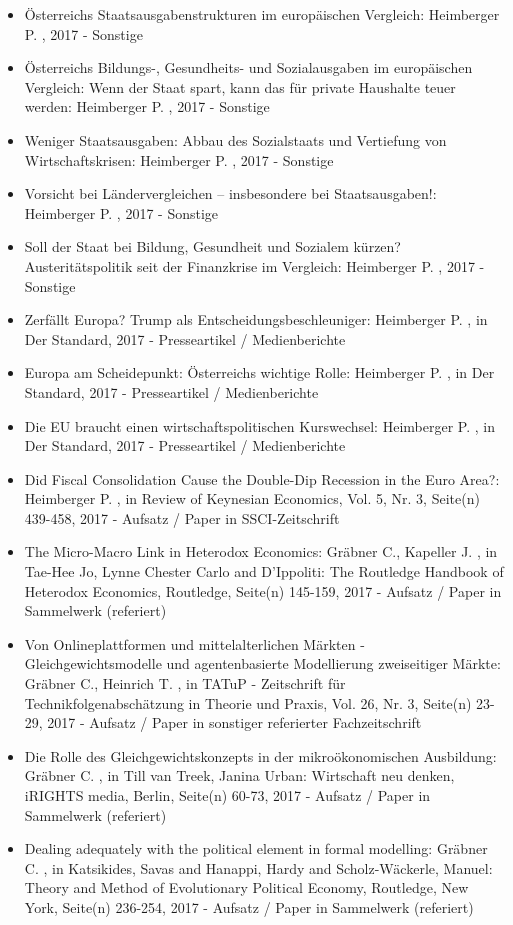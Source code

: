 \begin{itemize}
	 \item Österreichs Staatsausgabenstrukturen im europäischen Vergleich: Heimberger P. , 2017 - Sonstige
	 \item Österreichs Bildungs-, Gesundheits- und Sozialausgaben im europäischen Vergleich: Wenn der Staat spart, kann das für private Haushalte teuer werden: Heimberger P. , 2017 - Sonstige
	 \item Weniger Staatsausgaben: Abbau des Sozialstaats und Vertiefung von Wirtschaftskrisen: Heimberger P. , 2017 - Sonstige
	 \item Vorsicht bei Ländervergleichen – insbesondere bei Staatsausgaben!: Heimberger P. , 2017 - Sonstige
	 \item Soll der Staat bei Bildung, Gesundheit und Sozialem kürzen? Austeritätspolitik seit der Finanzkrise im Vergleich: Heimberger P. , 2017 - Sonstige
	 \item Zerfällt Europa? Trump als Entscheidungsbeschleuniger: Heimberger P. , in Der Standard, 2017 - Presseartikel / Medienberichte
	 \item Europa am Scheidepunkt: Österreichs wichtige Rolle: Heimberger P. , in Der Standard, 2017 - Presseartikel / Medienberichte
	 \item Die EU braucht einen wirtschaftspolitischen Kurswechsel: Heimberger P. , in Der Standard, 2017 - Presseartikel / Medienberichte
	 \item Did Fiscal Consolidation Cause the Double-Dip Recession in the Euro Area?: Heimberger P. , in Review of Keynesian Economics, Vol. 5, Nr. 3, Seite(n) 439-458, 2017 - Aufsatz / Paper in SSCI-Zeitschrift
	 \item The Micro-Macro Link in Heterodox Economics: Gräbner C., Kapeller J. , in Tae-Hee Jo, Lynne Chester Carlo and D'Ippoliti: The Routledge Handbook of Heterodox Economics, Routledge, Seite(n) 145-159, 2017 - Aufsatz / Paper in Sammelwerk (referiert)
	 \item Von Onlineplattformen und mittelalterlichen Märkten - Gleichgewichtsmodelle und agentenbasierte Modellierung zweiseitiger Märkte: Gräbner C., Heinrich T. , in TATuP - Zeitschrift für Technikfolgenabschätzung in Theorie und Praxis, Vol. 26, Nr. 3, Seite(n) 23-29, 2017 - Aufsatz / Paper in sonstiger referierter Fachzeitschrift
	 \item Die Rolle des Gleichgewichtskonzepts in der mikroökonomischen Ausbildung: Gräbner C. , in Till van Treek, Janina Urban: Wirtschaft neu denken, iRIGHTS media, Berlin, Seite(n) 60-73, 2017 - Aufsatz / Paper in Sammelwerk (referiert)
	 \item Dealing adequately with the political element in formal modelling: Gräbner C. , in Katsikides, Savas and Hanappi, Hardy and Scholz-Wäckerle, Manuel: Theory and Method of Evolutionary Political Economy, Routledge, New York, Seite(n) 236-254, 2017 - Aufsatz / Paper in Sammelwerk (referiert)

\end{itemize}

